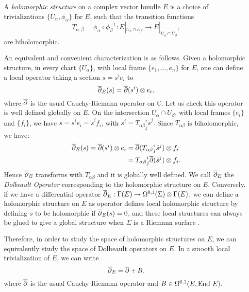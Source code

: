 	\begin{definition}
		A \textit{holomorphic structure} on a complex vector bundle $E$ is a choice of trivializations $\{U_\alpha, \phi_\alpha\}$ for $E$, such that the transition functions
		\begin{equation*}
		T_{\alpha,\beta} = \phi_\alpha \circ \phi^{-1}_\beta: E|_{U_\alpha \cap U_\beta} \to E|_{U_\alpha \cap U_\beta},
		\end{equation*}
		are biholomorphic. 
	\end{definition}
	An equivalent and convenient characterization is as follows. Given a holomorphic structure, in every chart $\{U_\alpha\}$, with local frame $\{e_1,...,e_n\}$ for $E$, one can define a local operator taking a section $s = s^i e_i$ to
	\begin{equation*}
	\overline{\partial}_E(s) = \overline{\partial}(s^i)\otimes e_i,
	\end{equation*}
	where $\overline{\partial}$ is the usual Cauchy-Riemann operator on $\mathbb{C}$. Let us check this operator is well defined globally on $E$. On the intersection $U_\alpha \cap U_\beta$, with local frames $\{e_i\}$ and $\{f_i\}$, we have $s = s^i e_i = \tilde{s}^i f_i$, with $s^i = {T_{\alpha\beta}}^i_j\tilde{s}^j.$ Since $T_{\alpha\beta}$ is biholomorphic, we have:
	\begin{align*}
	\overline{\partial}_E(s) = \overline{\partial}(s^i)\otimes e_i &= \overline{\partial}({T_{\alpha\beta}}^i_j \tilde{s}^j)\otimes f_i\\
	&= {T_{\alpha\beta}}^i_j \overline{\partial}(\tilde{s}^j)\otimes f_i.
	\end{align*}
	Hence $\overline{\partial}_E$ transforms with $T_{\alpha\beta}$ and it is globally well defined. We call $\overline{\partial}_E$ the \textit{Dolbeault Operator} corresponding to the holomorphic structure on $E$. Conversely, if we have a differential operator $\overline{\partial}_E:\Gamma(E) \to \Omega^{0,1}(\Sigma)\otimes \Gamma(E)$, we can define a holomorphic structure on $E$ as operator defines local holomorphic structure by defining $s$ to be holomorphic if $\overline{\partial}_E(s)=0$, and these local structures can always be glued to give a global structure when $\Sigma$ is a Riemann surface \cite[\S5]{atiyah_yang-mills_1983}.
	
	Therefore, in order to study the space of holomorphic structures on $E$, we can equivalently study the space of Dolbeault operators on $E$. In a smooth local trivialization of $E$, we can write 
	\begin{equation*}
	\overline{\partial}_E = \overline{\partial} + B,
	\end{equation*}
	where $\overline{\partial}$ is the usual Cauchy-Riemann operator and $B \in \Omega^{0,1}(E, \text{End } E)$.
	
